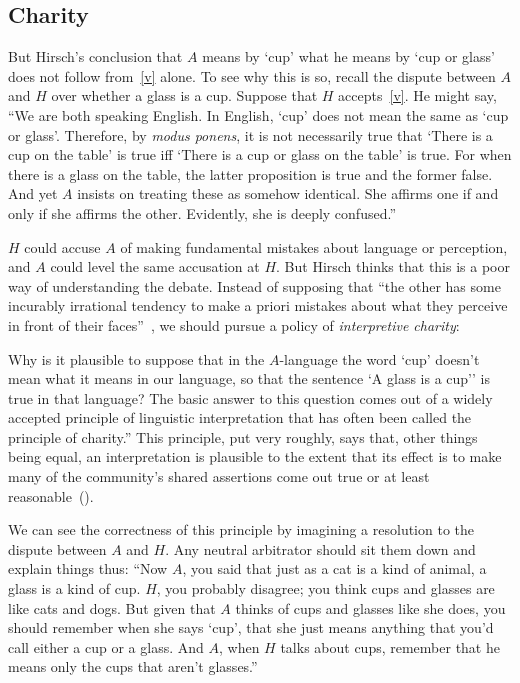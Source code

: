 \documentclass[11pt]{article}
\newenvironment{squote}{%
\begin{spacing}{1}
       	\begin{list}{}{%
\setlength{\labelwidth}{0pt}%
\rightmargin\leftmargin%
}
\item\relax
}{%
\end{list}%
\end{spacing}
}
\begin{document}
\begin{spacing}{1.25}
\subsection{Charity}
\label{charity}
But Hirsch's conclusion that $A$ means by `cup' what he means by `cup
or glass' does not follow from~\ref{v} alone.  To see why this is so,
recall the dispute between $A$ and $H$ over whether a glass is a cup.
Suppose that $H$ accepts~\ref{v}.  He might say, ``We are both
speaking English.  In English, `cup' does not mean the same as `cup or
glass'. Therefore, by {\em modus ponens}, it is not necessarily true
that `There is a cup on the table' is true iff `There is a cup or
glass on the table' is true.  For when there is a glass on the table,
the latter proposition is true and the former false.  And yet $A$
insists on treating these as somehow identical.  She affirms one if
and only if she affirms the other.  Evidently, she is deeply
confused.''

$H$ could accuse $A$ of making fundamental mistakes about language or
perception, and $A$ could level the same accusation at $H$.  But
Hirsch thinks that this is a poor way of understanding the
debate.  Instead of supposing that ``the other has some incurably
irrational tendency to make a priori mistakes about what they perceive
in front of their faces''~\citep[78]{hirsch2005}, we should pursue a
policy of {\em interpretive charity}:

\begin{squote}
Why is it plausible to suppose that in the $A$-language the word
`cup' doesn't mean what it means in our language, so that the sentence
`A glass is a cup'' is true in that language?  The basic answer to
this question comes out of a widely accepted principle of linguistic
interpretation that has often been called the principle of charity.''
This principle, put very roughly, says that, other things being equal,
an interpretation is plausible to the extent that its effect is to
make many of the community's shared assertions come out true or at
least reasonable~(\citeyear[71]{hirsch2005}).
\end{squote}

We can see the correctness of this principle by imagining a resolution
to the dispute between $A$ and $H$.  Any neutral arbitrator should
sit them down and explain things thus:  ``Now $A$, you said that just
as a cat is a kind of animal, a glass is a kind of cup.  $H$, you
probably disagree; you think cups and glasses are like cats and
dogs.  But given that $A$ thinks of cups and glasses like she does, you
should remember when she says `cup', that she just means anything that
you'd call either a cup or a glass.  And $A$, when $H$ talks about
cups, remember that he means only the cups that aren't glasses.''


\end{spacing}
\end{document}
